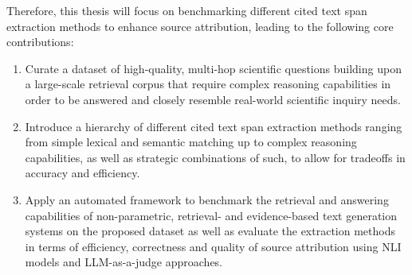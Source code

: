 Therefore, this thesis will focus on benchmarking different cited text span extraction methods to enhance source attribution, leading to the following core contributions:
\begin{enumerate}
    \item Curate a dataset of high-quality, multi-hop scientific questions building upon a large-scale retrieval corpus that require complex reasoning capabilities in order to be answered and closely resemble real-world scientific inquiry needs.
    \item Introduce a hierarchy of different cited text span extraction methods ranging from simple lexical and semantic matching up to complex reasoning capabilities, as well as strategic combinations of such, to allow for tradeoffs in accuracy and efficiency.
    \item Apply an automated framework to benchmark the retrieval and answering capabilities of non-parametric, retrieval- and evidence-based text generation systems on the proposed dataset as well as evaluate the extraction methods in terms of efficiency, correctness and quality of source attribution using NLI models and LLM-as-a-judge approaches.
\end{enumerate}








%
%
% 
%


%
%
%
%


